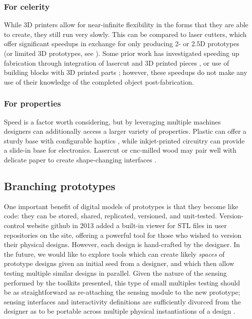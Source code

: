     \subsubsection{For celerity}

    While 3D printers allow for near-infinite flexibility in the forms that they are able to create, they still run very slowly. This can be compared to laser cutters, which offer significant speedups in exchange for only producing 2- or 2.5D prototypes (or limited 3D prototypes, see \cite{mueller-laserorigami}). Some prior work has investigated speeding up fabrication through integration of lasercut and 3D printed pieces \cite{beyer-platener}, or use of building blocks with 3D printed parts \cite{mueller-fabrickation}; however, these speedups do not make any use of their knowledge of the completed object post-fabrication.

    \subsubsection{For properties}
    
    Speed is a factor worth considering, but by leveraging multiple machines designers can additionally access a larger variety of properties. Plastic can offer a sturdy base with configurable haptics \cite{torres-hapticprint}, while inkjet-printed circuitry can provide a slide-in base for electronics. Lasercut or cnc-milled wood may pair well with delicate paper to create shape-changing interfaces \cite{yao-pneui}.

\subsection{Branching prototypes}

One important benefit of digital models of prototypes is that they become like code: they can be stored, shared, replicated, versioned, and unit-tested. Version-control website github \cite{github} in 2013 added a built-in viewer for STL files in user repositories on the site, offering a powerful tool for those who wished to version their physical designs. However, each design is hand-crafted by the designer. In the future, we would like to explore tools which can create likely \emph{spaces} of prototype designs given an initial seed from a designer, and which then allow testing multiple similar designs in parallel. Given the nature of the sensing performed by the toolkits presented, this type of small multiples testing should be as straightforward as re-attaching the sensing module to the new prototype; sensing interfaces and interactivity definitions are sufficiently divorced from the designer as to be portable across multiple physical instantiations of a design .

